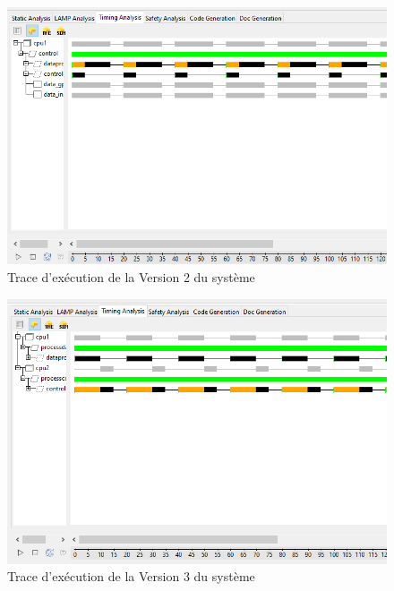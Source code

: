\documentclass[a4paper,12pt]{report}
\begin{document}
		\begin{figure}[H]
			\centering
				\includegraphics[scale=0.5]{execV2.png}
				\caption{Trace d'exécution de la Version 2 du système}
			\label{execV2}
		\end{figure}
		
		\begin{figure}[H]
			\centering
				\includegraphics[scale=0.5]{execV3.png}
				\caption{Trace d'exécution de la Version 3 du système}
			\label{execV3}
		\end{figure}
	
	
	\clearpage
\end{document}
